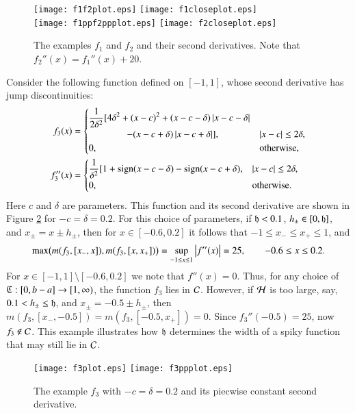 \documentclass[review]{elsarticle}
\begin{document}
\begin{figure}[t]
\centering
\texttt{[image: f1f2plot.eps]} \qquad
\texttt{[image: f1closeplot.eps]} \\
\texttt{[image: f1ppf2ppplot.eps]} \qquad
\texttt{[image: f2closeplot.eps]}
\caption{The examples $f_1$ and $f_2$ and their second derivatives. Note that
$f_2''(x) = f_1''(x) + 20$.}
\label{f1f2fig}
\end{figure}

Consider the following function defined on $[-1,1]$, whose second derivative has jump discontinuities:
\begin{align*}
f_3(x) & = \begin{cases} \displaystyle \frac{1}{2\delta^2} [4 \delta^2 + (x-c)^2 + (x-c-\delta)\left \lvert x-c-\delta \right \rvert \\
\qquad \qquad - (x-c+\delta)\left \lvert x-c+\delta \right \rvert], & \left \lvert x-c \right \rvert \le 2\delta, \\
0, & \text{otherwise},
\end{cases} \\
f''_3(x) & = \begin{cases} \displaystyle \frac{1}{\delta^2} [1 + \operatorname{sign}(x-c-\delta) - \operatorname{sign}(x-c+\delta), & \left \lvert x-c \right \rvert \le 2\delta, \\
0, & \text{otherwise}.
\end{cases}
\end{align*}
Here $c$ and $\delta$ are parameters. This function and its second derivative
are shown in Figure \ref{f3fig} for $-c=\delta = 0.2$. For this choice of
parameters, if $\mathfrak{h} < 0.1$, $h_\pm \in [0,\mathfrak{h}]$, and $x_\pm = x\pm h_\pm$, then
for $x \in [-0.6, 0.2]$ it follows that $-1 \le x_- \le x_+ \le 1$, and
\[
\max\bigl(m(f_3,[x_-,x]),m(f_3,[x,x_+])\bigr) = \sup_{-1 \le x \le 1} \left \lvert f''(x) \right \rvert = 25, \qquad -0.6 \le x \le 0.2.
\]
For $x \in [-1,1] \setminus [-0.6, 0.2]$ we note that $f''(x) = 0$. Thus, for
any choice of $\mathfrak{C} : [0,b-a] \to [1,\infty)$, the function $f_3$ lies in $\mathcal{C}$.
However, if $\mathcal{H}$ is too large, say, $0.1 < h_\pm \le \mathfrak{h}$, and $x_\pm = -0.5\pm
h_\pm$, then $m(f_3,[x_-,-0.5])=m(f_3,[-0.5,x_+])=0$. Since $f_3''(-0.5) = 25$,
now $f_3 \notin \mathcal{C}$. This example illustrates how $\mathfrak{h}$ determines the width of
a spiky function that may still lie in $\mathcal{C}$.

\begin{figure}[t]
\centering
\texttt{[image: f3plot.eps]} \qquad
\texttt{[image: f3ppplot.eps]} 
\caption{The example $f_3$ with $-c=\delta = 0.2$  and its piecwise constant second derivative.}
\label{f3fig}
\end{figure}
\end{document}
